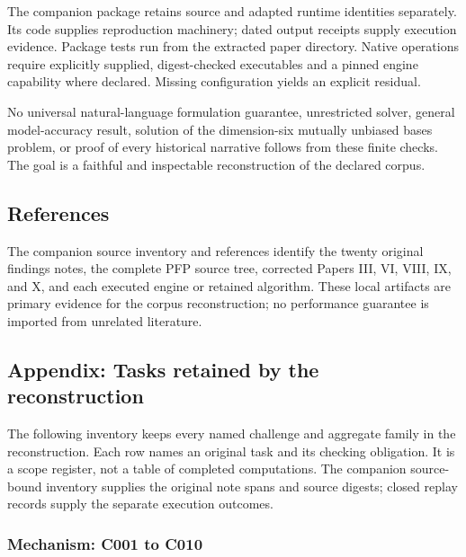 \documentclass[
  11pt,
]{article}
\begin{document}
The companion package retains source and adapted runtime identities
separately. Its code supplies reproduction machinery; dated output
receipts supply execution evidence. Package tests run from the extracted
paper directory. Native operations require explicitly supplied,
digest-checked executables and a pinned engine capability where
declared. Missing configuration yields an explicit residual.

No universal natural-language formulation guarantee, unrestricted
solver, general model-accuracy result, solution of the dimension-six
mutually unbiased bases problem, or proof of every historical narrative
follows from these finite checks. The goal is a faithful and inspectable
reconstruction of the declared corpus.

\subsection{References}\label{references}

The companion source inventory and references identify the twenty
original findings notes, the complete PFP source tree, corrected Papers
III, VI, VIII, IX, and X, and each executed engine or retained
algorithm. These local artifacts are primary evidence for the corpus
reconstruction; no performance guarantee is imported from unrelated
literature.

\subsection{Appendix: Tasks retained by the
reconstruction}\label{appendix-tasks-retained-by-the-reconstruction}

The following inventory keeps every named challenge and aggregate family
in the reconstruction. Each row names an original task and its checking
obligation. It is a scope register, not a table of completed
computations. The companion source-bound inventory supplies the original
note spans and source digests; closed replay records supply the separate
execution outcomes.

\subsubsection{Mechanism: C001 to C010}\label{mechanism-c001-to-c010}
\end{document}
